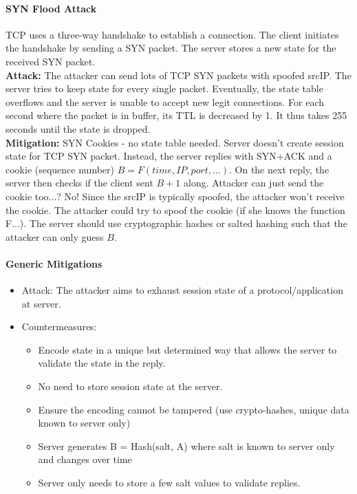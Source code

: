 \paragraph{SYN Flood Attack}
TCP uses a three-way handshake to establish a connection. The client initiates the handshake by sending a SYN packet. The server stores a new state for the received SYN packet.\\
\textbf{Attack:} The attacker can send lots of TCP SYN packets with spoofed srcIP. The server tries to keep state for every single packet. Eventually, the state table overflows and the server is unable to accept new legit connections. For each second where the packet is in buffer, its TTL is decreased by 1. It thus takes 255 seconds until the state is dropped.\\
\textbf{Mitigation:} SYN Cookies - no state table needed. Server doesn't create session state for TCP SYN packet. Instead, the server replies with SYN+ACK and a cookie (sequence number) $B=F(time,IP,port,...)$. On the next reply, the server then checks if the client sent $B+1$ along. Attacker can just send the cookie too...? No! Since the srcIP is typically spoofed, the attacker won't receive the cookie. The attacker could try to spoof the cookie (if she knows the function F...). The server should use cryptographic hashes or salted hashing such that the attacker can only guess $B$.

\paragraph{Generic Mitigations}
\begin{itemize}
    \item Attack: The attacker aims to exhaust session state of a protocol/application at server.
    \item Countermeasures:
    \begin{itemize}
        \item Encode state in a unique but determined way that allows the server to validate the state in the reply.
        \item No need to store session state at the server.
        \item Ensure the encoding cannot be tampered (use crypto-hashes, unique data known to server only)
        \item Server generates B = Hash(salt, A) where salt is known to server only and changes over time
        \item Server only needs to store a few salt values to validate replies.
    \end{itemize}
\end{itemize}

